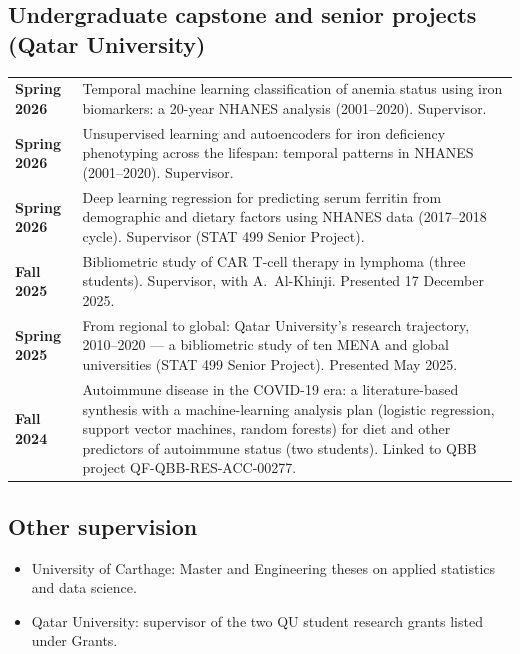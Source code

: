 \documentclass[10pt,a4paper]{article}
\makeatletter
\newenvironment{cvdated}{%
  \begin{longtable}{@{}>{\raggedleft\arraybackslash\bfseries}p{3.35cm}@{\hspace{0.35cm}}p{\dimexpr\textwidth-3.7cm\relax}@{}}}%
  {\end{longtable}\vspace{-10pt}}
\newcommand{\cvrow}[2]{#1 & #2 \\[3pt]}
\makeatother
\begin{document}
\subsection{Undergraduate capstone and senior projects (Qatar University)}
\begin{cvdated}
\cvrow{Spring 2026}{Temporal machine learning classification of anemia status using iron biomarkers: a 20-year NHANES analysis (2001--2020). Supervisor.}
\cvrow{Spring 2026}{Unsupervised learning and autoencoders for iron deficiency phenotyping across the lifespan: temporal patterns in NHANES (2001--2020). Supervisor.}
\cvrow{Spring 2026}{Deep learning regression for predicting serum ferritin from demographic and dietary factors using NHANES data (2017--2018 cycle). Supervisor (STAT 499 Senior Project).}
\cvrow{Fall 2025}{Bibliometric study of CAR T-cell therapy in lymphoma (three students). Supervisor, with A.~Al-Khinji. Presented 17 December 2025.}
\cvrow{Spring 2025}{From regional to global: Qatar University's research trajectory, 2010--2020 --- a bibliometric study of ten MENA and global universities (STAT 499 Senior Project). Presented May 2025.}
\cvrow{Fall 2024}{Autoimmune disease in the COVID-19 era: a literature-based synthesis with a machine-learning analysis plan (logistic regression, support vector machines, random forests) for diet and other predictors of autoimmune status (two students). Linked to QBB project QF-QBB-RES-ACC-00277.}
\end{cvdated}

\subsection{Other supervision}
\begin{itemize}
\item University of Carthage: Master and Engineering theses on applied statistics and data science.
\item Qatar University: supervisor of the two QU student research grants listed under Grants.
\end{itemize}

\end{document}

